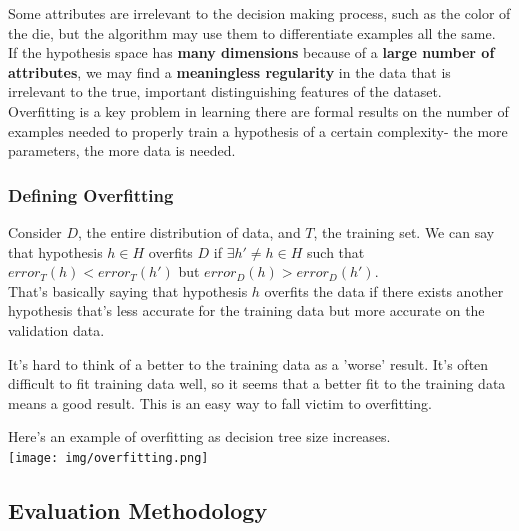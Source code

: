 \documentclass[english, 10pt]{article}
\begin{document}
Some attributes are irrelevant to the decision making process, such as the color of the die, but the algorithm may use them to differentiate examples all the same.\\

If the hypothesis space has \textbf{many dimensions} because of a \textbf{large number of attributes}, we may find a \textbf{meaningless regularity} in the data that is irrelevant to the true, important distinguishing features of the dataset.\\

Overfitting is a key problem in learning there are formal results on the number of examples needed to properly train a hypothesis of a certain complexity- the more parameters, the more data is needed.

\subsubsection{Defining Overfitting}

Consider $D$, the entire distribution of data, and $T$, the training set. We can say that hypothesis $h \in H$ overfits $D$ if $\exists h' \neq h \in H$ such that $error_T(h) < error_T(h')$ but $error_D(h) > error_D(h')$.\\

That's basically saying that hypothesis $h$ overfits the data if there exists another hypothesis that's less accurate for the training data but more accurate on the validation data.\\

\begin{tcolorbox}[title=Aside: Fitting Training Data vs. Validation Data,colframe=black,colback=white,arc=0pt,fonttitle=\bfseries]

It's hard to think of a better to the training data as a 'worse' result. It's often difficult to fit training data well, so it seems that a better fit to the training data means a good result. This is an easy way to fall victim to overfitting.

\end{tcolorbox}

\hfill \break Here's an example of overfitting as decision tree size increases.\\

\texttt{[image: img/overfitting.png]} 

\subsection{Evaluation Methodology}
\end{document}
